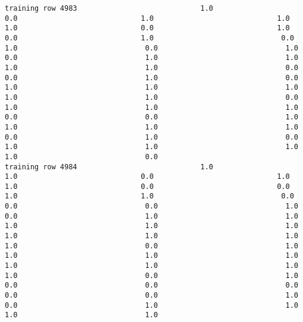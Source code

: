 \documentclass[11pt]{article}
\begin{document}
\begin{verbatim}
training row 4983                             1.0                             0.0                             1.0                             1.0                             1.0                             0.0                             1.0                             0.0                             1.0                              0.0                              1.0                              0.0                              1.0                              0.0                              1.0                              1.0                              1.0                              1.0                              0.0                              0.0                              1.0                              0.0                              1.0                              1.0                              1.0                              1.0                              1.0                              0.0                              1.0                              1.0                              1.0                              0.0                              0.0                              1.0                              1.0                              1.0                              1.0                              0.0                              1.0                              0.0                              1.0                              1.0                              1.0                              1.0                              0.0
training row 4984                             1.0                             1.0                             0.0                             1.0                             1.0                             0.0                             0.0                             1.0                             1.0                              0.0                              0.0                              0.0                              1.0                              0.0                              1.0                              1.0                              1.0                              1.0                              1.0                              1.0                              1.0                              1.0                              1.0                              0.0                              1.0                              1.0                              1.0                              1.0                              1.0                              1.0                              1.0                              1.0                              0.0                              1.0                              0.0                              0.0                              0.0                              0.0                              0.0                              1.0                              0.0                              1.0                              1.0                              1.0                              1.0

\end{verbatim}
\end{document}
